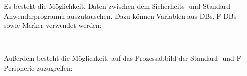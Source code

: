 Es besteht die Möglichkeit, Daten zwischen dem Sicherheits- und Standard- Anwenderprogramm auszutauschen. Dazu können Variablen aus DBs, F-DBs sowie Merker verwendet werden:

\renewcommand{\arraystretch}{1.3}
\begin{table}[H]
    \centering
    \caption[Datenaustausch zwischen Sicherheits- und Standard-Anwenderprogramm]{Datenaustausch zwischen Sicherheits- und Standard-Anwenderprogramm}
    \label{tab:7.1}
    \
\end{table}
\renewcommand{\arraystretch}{1}

Außerdem besteht die Möglichkeit, auf das Prozessabbild der Standard- und F-Peripherie zuzugreifen:

